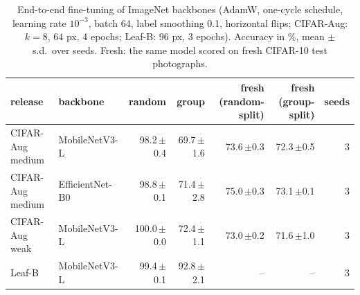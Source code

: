\begin{table}[h]
\centering\footnotesize
\setlength{\tabcolsep}{4pt}
\caption{End-to-end fine-tuning of ImageNet backbones (AdamW, one-cycle schedule, learning rate $10^{-3}$, batch 64, label smoothing 0.1, horizontal flips; CIFAR-Aug: $k=8$, $64$ px, 4 epochs; Leaf-B: $96$ px, 3 epochs). Accuracy in \%, mean $\pm$ s.d.\ over seeds. Fresh: the same model scored on fresh CIFAR-10 test photographs.}
\label{tab:finetune}
\begin{tabular}{@{}llrrrrr@{}}
\toprule
release & backbone & random & group & fresh (random-split) & fresh (group-split) & seeds \\
\midrule
CIFAR-Aug medium & MobileNetV3-L & 98.2\,{\scriptsize$\pm$0.4} & 69.7\,{\scriptsize$\pm$1.6} & 73.6\,{\scriptsize$\pm$0.3} & 72.3\,{\scriptsize$\pm$0.5} & 3 \\
CIFAR-Aug medium & EfficientNet-B0 & 98.8\,{\scriptsize$\pm$0.1} & 71.4\,{\scriptsize$\pm$2.8} & 75.0\,{\scriptsize$\pm$0.3} & 73.1\,{\scriptsize$\pm$0.1} & 3 \\
CIFAR-Aug weak & MobileNetV3-L & 100.0\,{\scriptsize$\pm$0.0} & 72.4\,{\scriptsize$\pm$1.1} & 73.0\,{\scriptsize$\pm$0.2} & 71.6\,{\scriptsize$\pm$1.0} & 3 \\
Leaf-B & MobileNetV3-L & 99.4\,{\scriptsize$\pm$0.1} & 92.8\,{\scriptsize$\pm$2.1} & -- & -- & 3 \\
\bottomrule
\end{tabular}
\end{table}
